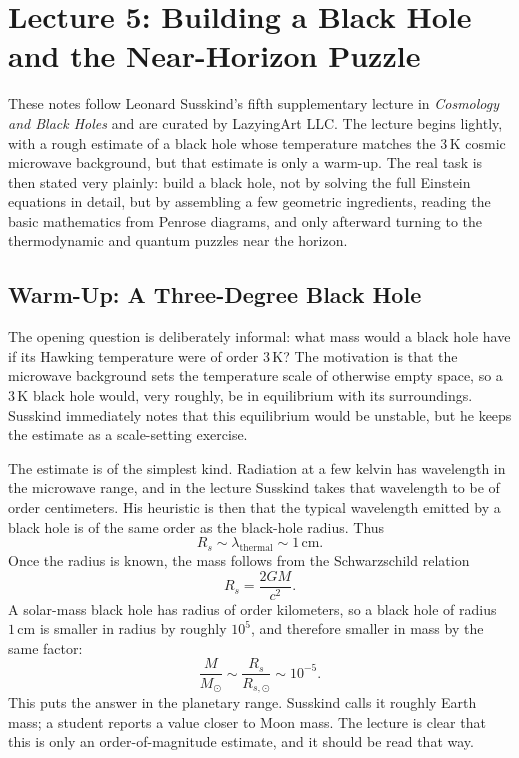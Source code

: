 \chapter{Lecture 5: Building a Black Hole and the Near-Horizon Puzzle}

These notes follow Leonard Susskind's fifth supplementary lecture in \emph{Cosmology and Black Holes} and are curated by LazyingArt LLC. The lecture begins lightly, with a rough estimate of a black hole whose temperature matches the \(3\,\mathrm{K}\) cosmic microwave background, but that estimate is only a warm-up. The real task is then stated very plainly: build a black hole, not by solving the full Einstein equations in detail, but by assembling a few geometric ingredients, reading the basic mathematics from Penrose diagrams, and only afterward turning to the thermodynamic and quantum puzzles near the horizon.

\section{Warm-Up: A Three-Degree Black Hole}

The opening question is deliberately informal: what mass would a black hole have if its Hawking temperature were of order \(3\,\mathrm{K}\)? The motivation is that the microwave background sets the temperature scale of otherwise empty space, so a \(3\,\mathrm{K}\) black hole would, very roughly, be in equilibrium with its surroundings. Susskind immediately notes that this equilibrium would be unstable, but he keeps the estimate as a scale-setting exercise.

The estimate is of the simplest kind. Radiation at a few kelvin has wavelength in the microwave range, and in the lecture Susskind takes that wavelength to be of order centimeters. His heuristic is then that the typical wavelength emitted by a black hole is of the same order as the black-hole radius. Thus
\begin{equation}
R_s \sim \lambda_{\text{thermal}} \sim 1\,\mathrm{cm}.
\end{equation}
Once the radius is known, the mass follows from the Schwarzschild relation
\begin{equation}
R_s=\frac{2GM}{c^2}.
\end{equation}
A solar-mass black hole has radius of order kilometers, so a black hole of radius \(1\,\mathrm{cm}\) is smaller in radius by roughly \(10^5\), and therefore smaller in mass by the same factor:
\begin{equation}
\frac{M}{M_\odot}\sim \frac{R_s}{R_{s,\odot}}\sim 10^{-5}.
\end{equation}
This puts the answer in the planetary range. Susskind calls it roughly Earth mass; a student reports a value closer to Moon mass. The lecture is clear that this is only an order-of-magnitude estimate, and it should be read that way.

